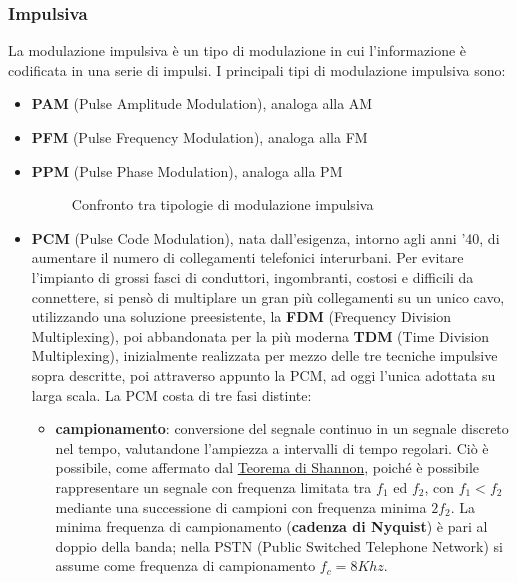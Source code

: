 \documentclass[a4paper,11pt]{article}
\def\subsub#1{\subsubsection{#1}\label{#1}}
\begin{document}
\subsub{Impulsiva}
La modulazione impulsiva è un tipo di modulazione in cui l'informazione è codificata in una serie di impulsi. I principali tipi di modulazione impulsiva sono:
\begin{itemize}
\item \textbf{PAM} (Pulse Amplitude Modulation), analoga alla AM
\item \textbf{PFM} (Pulse Frequency Modulation), analoga alla FM
\item \textbf{PPM} (Pulse Phase Modulation), analoga alla PM
\begin{figure}[h]
\centering
{}
\caption{Confronto tra tipologie di modulazione impulsiva}
\label{fig. 3}
\end{figure}
\item \textbf{PCM} (Pulse Code Modulation), nata dall'esigenza, intorno agli anni '40, di aumentare il numero di collegamenti telefonici interurbani. Per evitare l'impianto di grossi fasci di conduttori, ingombranti, costosi e difficili da connettere, si pensò di multiplare un gran più collegamenti su un unico cavo, utilizzando una soluzione preesistente, la \textbf{FDM} (Frequency Division Multiplexing), poi  abbandonata per la più moderna \textbf{TDM} (Time Division Multiplexing), inizialmente realizzata per mezzo delle tre tecniche impulsive sopra descritte, poi attraverso appunto la PCM, ad oggi l'unica adottata su larga scala. La PCM costa di tre fasi distinte:
\begin{itemize}
\item \textbf{campionamento}: conversione del segnale continuo in un segnale discreto nel tempo, valutandone l'ampiezza a intervalli di tempo regolari. Ciò è possibile, come affermato dal \href{<https://it.wikipedia.org/wiki/Teorema_del_campionamento_di_Nyquist-Shannon>}{Teorema di Shannon}, poiché è possibile rappresentare un segnale con frequenza limitata tra $f_{1}$ ed $f_{2}$, con $f_{1}<f_{2}$ mediante una successione di campioni con frequenza minima $2f_{2}$. La minima frequenza di campionamento (\textbf{cadenza di Nyquist}) è pari al doppio della banda; nella PSTN (Public Switched Telephone Network) si assume come frequenza di campionamento $f_{c}=8 Khz$.

\end{itemize}
\end{itemize}
\end{document}
